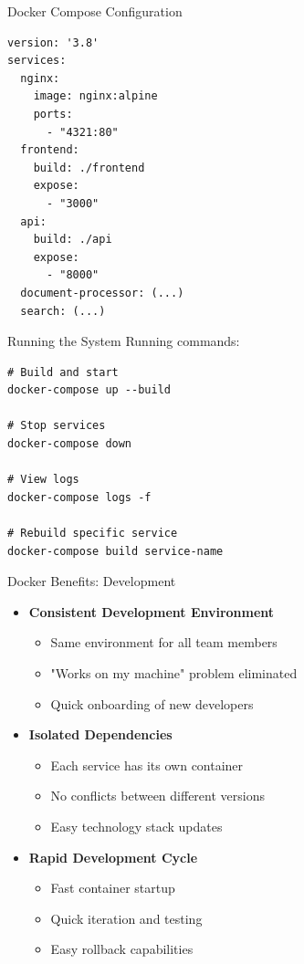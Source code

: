 \documentclass[notes]{beamer}
\begin{document}
\begin{frame}[fragile]{Docker Compose Configuration}
    \begin{verbatim}
version: '3.8'
services:
  nginx:
    image: nginx:alpine
    ports:
      - "4321:80"
  frontend:
    build: ./frontend
    expose:
      - "3000"
  api:
    build: ./api
    expose:
      - "8000"
  document-processor: (...)
  search: (...)
    \end{verbatim}
\end{frame}


\begin{frame}[fragile]{Running the System}
    Running commands:
    \begin{verbatim}
# Build and start
docker-compose up --build

# Stop services
docker-compose down

# View logs
docker-compose logs -f

# Rebuild specific service
docker-compose build service-name
    \end{verbatim}
\end{frame}

\begin{frame}{Docker Benefits: Development}
    \begin{itemize}
        \item \textbf{Consistent Development Environment}
        \begin{itemize}
            \item Same environment for all team members
            \item "Works on my machine" problem eliminated
            \item Quick onboarding of new developers
        \end{itemize}
        \item \textbf{Isolated Dependencies}
        \begin{itemize}
            \item Each service has its own container
            \item No conflicts between different versions
            \item Easy technology stack updates
        \end{itemize}
        \item \textbf{Rapid Development Cycle}
        \begin{itemize}
            \item Fast container startup
            \item Quick iteration and testing
            \item Easy rollback capabilities
        \end{itemize}
    \end{itemize}
\end{frame}
\end{document}
